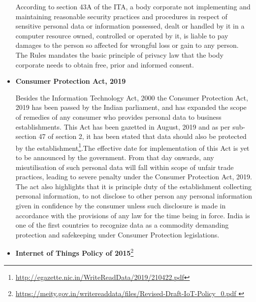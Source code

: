 \begin{multicols}{2}
\begin{itemize}
According to section 43A of the ITA, a body corporate not implementing and maintaining reasonable security practices and procedures in respect of sensitive personal data or information possessed, dealt or handled by it in a computer resource owned, controlled or operated by it, is liable to pay damages to the person so affected for wrongful loss or gain to any person. The Rules mandates the basic principle of privacy law that the body corporate needs to obtain free, prior and informed consent. 

\item[{\bf 2)}] \textbf{Consumer Protection Act, 2019}

Besides the Information Technology Act, 2000 the Consumer Protection Act, 2019 has been passed by the Indian parliament, and has expanded the scope of remedies of any consumer who provides personal data to business establishments. This Act has been gazetted in August, 2019 and as per sub-section 47 of section 2, it has been stated that data should also be protected by the establishment\footnote{\url{http://egazette.nic.in/WriteReadData/2019/210422.pdf}}.The effective date for implementation of this Act is yet to be announced by the government. From that day onwards, any misutilisation of such personal data will fall within scope of unfair trade practices, leading to severe penalty under the Consumer Protection Act, 2019. The act also highlights that it is principle duty of the establishment collecting personal information, to not disclose to other person any personal information given in confidence by the consumer unless such disclosure is made in accordance with the provisions of any law for the time being in force. India is one of the first countries to recognize data as a commodity demanding protection and safekeeping under Consumer Protection legislations.

\item[{\bf 3)}] \textbf{Internet of Things Policy of 2015}\footnote{\url{https://meity.gov.in/writereaddata/files/Revised-Draft-IoT-Policy_0.pdf
}}


\end{itemize}
\end{multicols}
